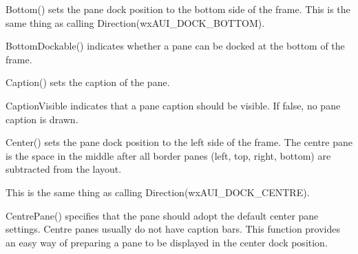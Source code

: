 
Bottom() sets the pane dock position to the bottom side of the frame. This is
the same thing as calling Direction(wxAUI\_DOCK\_BOTTOM).

\label{wxauipaneinfobottomdockable}


BottomDockable() indicates whether a pane can be docked at the bottom of the frame.

\label{wxauipaneinfocaption}


Caption() sets the caption of the pane.

\label{wxauipaneinfocaptionvisible}


CaptionVisible indicates that a pane caption should be visible. If false, no pane caption is drawn.

\label{wxauipaneinfocentre}



Center() sets the pane dock position to the left side of the frame.
The centre pane is the space in the middle after all border panes (left, top, right, bottom) are subtracted from the layout.

This is the same thing as calling Direction(wxAUI\_DOCK\_CENTRE). 

\label{wxauipaneinfocentrepane}



CentrePane() specifies that the pane should adopt the default center pane settings. Centre panes usually do not have caption bars. This function provides an easy way of preparing a pane to be displayed in the center dock position.

\label{wxauipaneinfoclosebutton}


